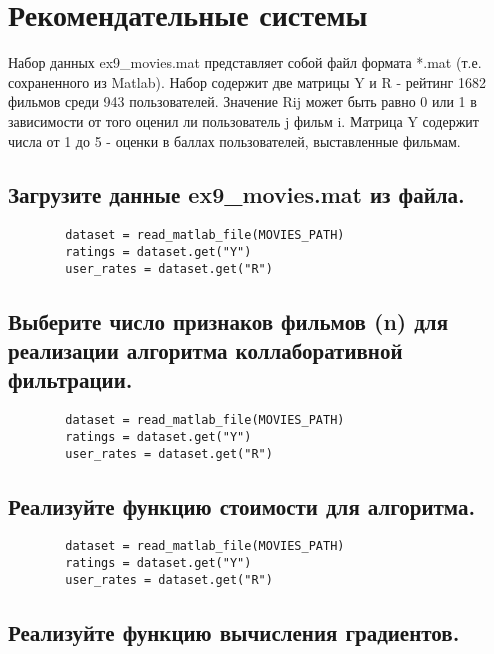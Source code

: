 







\section{Рекомендательные системы}
\label{sec:purpose}

Набор данных ex9_movies.mat представляет собой файл формата *.mat (т.е. сохраненного из Matlab). Набор содержит две матрицы Y и R - рейтинг 1682 фильмов среди 943 пользователей. Значение Rij может быть равно 0 или 1 в зависимости от того оценил ли пользователь j фильм i. Матрица Y содержит числа от 1 до 5 - оценки в баллах пользователей, выставленные фильмам.

\subsection{Загрузите данные ex9_movies.mat из файла.}

\begin{lstlisting}
        dataset = read_matlab_file(MOVIES_PATH)
        ratings = dataset.get("Y")
        user_rates = dataset.get("R")
\end{lstlisting}

\subsection{Выберите число признаков фильмов (n) для реализации алгоритма коллаборативной фильтрации.}

\begin{lstlisting}
        dataset = read_matlab_file(MOVIES_PATH)
        ratings = dataset.get("Y")
        user_rates = dataset.get("R")
\end{lstlisting}

\subsection{Реализуйте функцию стоимости для алгоритма.}

\begin{lstlisting}
        dataset = read_matlab_file(MOVIES_PATH)
        ratings = dataset.get("Y")
        user_rates = dataset.get("R")
\end{lstlisting}

\subsection{Реализуйте функцию вычисления градиентов.}

